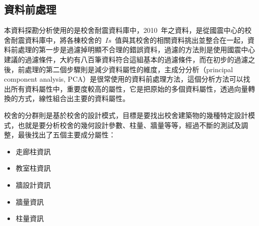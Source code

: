 
\subsection{資料前處理}

本資料探勘分析使用的是校舍耐震資料庫中，2010~年之資料，是從國震中心的校舍耐震資料庫中，將各棟校舍的~$Is$~值與其校舍的相關資料挑出並整合在一起，資料前處理的第一步是過濾掉明顯不合理的錯誤資料，過濾的方法則是使用國震中心建議的過濾條件，大約有八百筆資料符合這組基本的過濾條件，而在初步的過濾之後，前處理的第二個步驟則是減少資料屬性的維度，主成分分析（principal component analysis, PCA）是很常使用的資料前處理方法，這個分析方法可以找出所有資料屬性中，重要度較高的屬性，它是把原始的多個資料屬性，透過向量轉換的方式，線性組合出主要的資料屬性。


校舍的分群則是基於校舍的設計模式，目標是要找出校舍建築物的幾種特定設計模式，也就是要分析校舍的幾何設計參數、柱量、牆量等等，經過不斷的測試及調整，最後找出了五個主要成分屬性：

\begin{itemize}
\item 走廊柱資訊
\item 教室柱資訊
\item 牆設計資訊
\item 牆量資訊
\item 柱量資訊
\end{itemize}

